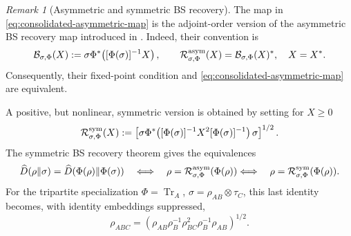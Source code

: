 \documentclass[11pt]{article}
\theoremstyle{remark}
\newtheorem{remark}[remark]{Remark}
\newcommand{\1}{\mathbbm{1}}
\begin{document}
\begin{remark}[Asymmetric and symmetric BS recovery]
The map in \eqref{eq:consolidated-asymmetric-map} is the
adjoint-order version of the asymmetric BS recovery map introduced
in 
\cite[Theorem~4.2 and (14)]{bluhm2020strengthened}.
Indeed, their convention is
\begin{equation}
 \mathcal B_{\sigma,\Phi}(X)
 :=\sigma\Phi^*\!\left([\Phi(\sigma)]^{-1}X\right),
 \qquad
 \mathcal R_{\sigma,\Phi}^{\rm asym}(X)
 =\mathcal B_{\sigma,\Phi}(X)^*,\quad X=X^*.
 \label{eq:consolidated-two-asymmetric-orders}
\end{equation}
Consequently, their fixed-point condition and
\eqref{eq:consolidated-asymmetric-map} are equivalent.

A positive, but nonlinear, symmetric version is obtained by setting
for $X\geq0$
\begin{equation}
 \mathcal R_{\sigma,\Phi}^{\rm sym}(X)
 :=\left[\sigma\Phi^*\!\left(
 [\Phi(\sigma)]^{-1}X^2[\Phi(\sigma)]^{-1}
 \right)\sigma\right]^{1/2}.
 \label{eq:consolidated-nonlinear-symmetric-BS-map}
\end{equation}
The symmetric BS recovery theorem
\cite[Theorem~5.1]{Bluhm:2025kai} gives the equivalences
\begin{multline}
 \widehat D(\rho\Vert\sigma)
 =\widehat D(\Phi(\rho)\Vert\Phi(\sigma))
 \quad\Longleftrightarrow\quad
 \rho=\mathcal R_{\sigma,\Phi}^{\rm asym}(\Phi(\rho))
 \Longleftrightarrow\quad
 \rho=\mathcal R_{\sigma,\Phi}^{\rm sym}(\Phi(\rho)).
 \label{eq:consolidated-symmetric-BS-equivalence}
\end{multline}
For the tripartite specialization
$\Phi=\operatorname{Tr}_A$, $\sigma=\rho_{AB}\otimes\tau_C$, this last identity
becomes, with identity embeddings suppressed,
\begin{equation}
 \rho_{ABC}
 =\left(
 \rho_{AB}\rho_B^{-1}\rho_{BC}^{2}
 \rho_B^{-1}\rho_{AB}
 \right)^{1/2}.
 \label{eq:consolidated-tripartite-nonlinear-symmetric-BS}
\end{equation}


\end{remark}
\end{document}
